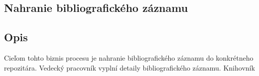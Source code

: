\documentclass[10pt,oneside,slovak,a4paper]{article}
\begin{document}
\subsection{Nahranie bibliografického záznamu}

\subsection{Opis}

Cieľom tohto biznis procesu je nahranie bibliografického záznamu do konkrétneho repozitára. Vedecký pracovník vyplní detaily bibliografického záznamu. Knihovník
\end{document}
